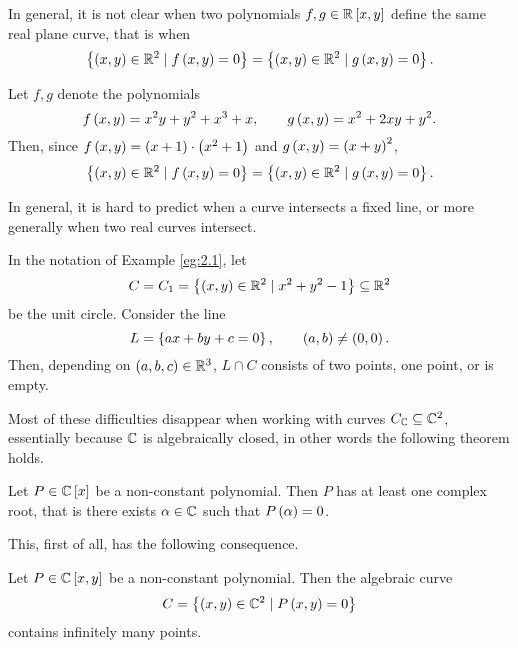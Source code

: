 \begin{fact*}
In general, it is not clear when two polynomials $ f, g \in \mathbb{R}\left[ x, y \right] $ define the same real plane curve, that is when
$$ \left\{ \left( x, y \right) \in \mathbb{R}^2 \mid f\left( x, y \right) = 0 \right\} = \left\{ \left( x, y \right) \in \mathbb{R}^2 \mid g\left( x, y \right) = 0 \right\}. $$
\end{fact*}

\begin{example}
\label{eg:2.2}
Let $ f, g $ denote the polynomials
$$ f\left( x, y \right) = x^2y + y^2 + x^3 + x, \qquad g\left( x, y \right) = x^2 + 2xy + y^2. $$
Then, since $ f\left( x, y \right) = \left( x + 1 \right) \cdot \left( x^2 + 1 \right) $ and $ g\left( x, y \right) = \left( x + y \right)^2 $,
$$ \left\{ \left( x, y \right) \in \mathbb{R}^2 \mid f\left( x, y \right) = 0 \right\} = \left\{ \left( x, y \right) \in \mathbb{R}^2 \mid g\left( x, y \right) = 0 \right\}. $$
\end{example}

\begin{fact*}
In general, it is hard to predict when a curve intersects a fixed line, or more generally when two real curves intersect.
\end{fact*}

\begin{example}
In the notation of Example \ref{eg:2.1}, let
$$ C = C_1 = \left\{ \left( x, y \right) \in \mathbb{R}^2 \mid x^2 + y^2 - 1 \right\} \subseteq \mathbb{R}^2 $$
be the unit circle. Consider the line
$$ L = \left\{ ax + by + c = 0 \right\}, \qquad \left( a, b \right) \ne \left( 0, 0 \right). $$
Then, depending on $ \left( a, b, c \right) \in \mathbb{R}^3 $, $ L \cap C $ consists of two points, one point, or is empty.
\end{example}

Most of these difficulties disappear when working with curves $ C_{\mathbb{C}} \subseteq \mathbb{C}^2 $, essentially because $ \mathbb{C} $ is algebraically closed, in other words the following theorem holds.

\begin{theorem}
\label{thm:2.4}
Let $ P \in \mathbb{C}\left[ x \right] $ be a non-constant polynomial. Then $ P $ has at least one complex root, that is there exists $ \alpha \in \mathbb{C} $ such that $ P\left( \alpha \right) = 0 $.
\end{theorem}

This, first of all, has the following consequence.

\begin{proposition}
Let $ P \in \mathbb{C}\left[ x, y \right] $ be a non-constant polynomial. Then the algebraic curve
$$ C = \left\{ \left( x, y \right) \in \mathbb{C}^2 \mid P\left( x, y \right) = 0 \right\} $$
contains infinitely many points.
\end{proposition}

